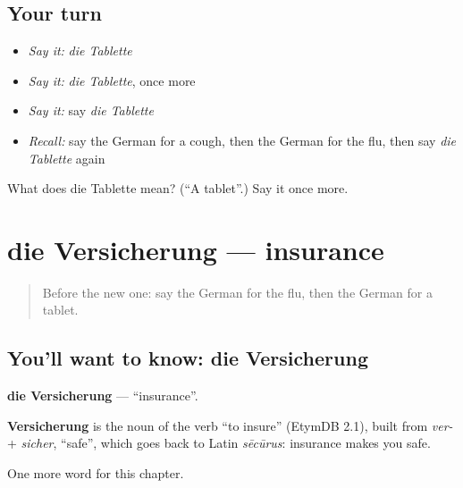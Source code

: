 \subsection*{Your turn}
\begin{itemize}
\raggedright
  \item \emph{Say it:} \emph{die Tablette}
  \item \emph{Say it:} \emph{die Tablette}, once more
  \item \emph{Say it:} say \emph{die Tablette}
  \item \emph{Recall:} say the German for a cough, then the German for the flu, then say \emph{die Tablette} again
\end{itemize}

\begin{tcolorbox}[breakable,colback=teal!4,colframe=teal!35!black,title={Before you move on}]
What does die Tablette mean? (\textquotedblleft{}A tablet\textquotedblright{}.) Say it once more.
\end{tcolorbox}
\section[die Versicherung]{die Versicherung — insurance}

\label{lesson:GE-C157-versicherung}



\begin{quote}
Before the new one: say the German for the flu, then the German for a tablet.
\end{quote}

\subsection*{You'll want to know: die Versicherung}
\textbf{die Versicherung} — \textquotedblleft{}insurance\textquotedblright{}.

\begin{cousinweb}
\textbf{Versicherung} is the noun of the verb \textquotedblleft{}to insure\textquotedblright{} (EtymDB 2.1), built from \emph{ver-} + \emph{sicher}, \textquotedblleft{}safe\textquotedblright{}, which goes back to Latin \emph{sēcūrus}: insurance makes you safe.
\end{cousinweb}

\begin{grammarlens}[title={What you've built}]
One more word for this chapter.
\end{grammarlens}

